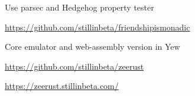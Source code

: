 \documentclass[letterpaper,11pt,notitlepage]{article}
\begin{document}
    \begin{employment}
      \item Use parsec and Hedgehog property tester
      \item \url{https://github.com/stillinbeta/friendshipismonadic}
    \end{employment}
    \begin{employment}
      \item Core emulator and web-assembly version in Yew
      \item \url{https://github.com/stillinbeta/zeerust}
      \item \url{https://zeerust.stillinbeta.com/}
    \end{employment}
\end{document}
